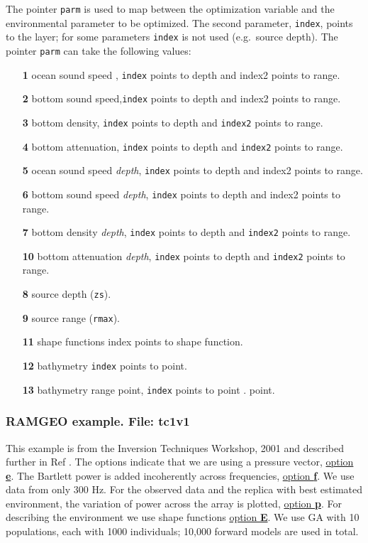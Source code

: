 \documentclass{saclantc}
\begin{document}
The pointer {\tt parm} is used to map between the optimization variable and the
environmental parameter to be optimized. The second parameter, {\tt index}, points to the
layer; for some parameters {\tt index} is not used (e.g.\ source depth).  
The pointer {\tt parm} can take the following values:
\begin{itemize}
   \item[\bf 1]  ocean sound speed , {\tt index} points to depth and index2 points to range.
   \item[\bf 2]  bottom sound speed,{\tt index} points to depth and index2
   points to range.
   \item[\bf 3]  bottom density, {\tt index} points to depth and {\tt index2} points to
   range.
   \item[\bf 4]  bottom attenuation, {\tt index}  points to depth and {\tt index2}
   points to range.
   \item[\bf 5]  ocean sound speed {\it depth}, {\tt index} points to depth and index2 points to range.
   \item[\bf 6]  bottom sound speed {\it depth}, {\tt index} points to depth and index2
   points to range.
   \item[\bf 7]  bottom density {\it depth},  {\tt index} points to depth and {\tt index2} points to
   range.
   \item[\bf 10]  bottom attenuation {\it depth}, {\tt index} points to depth and {\tt index2}
   points to range.

   \item[\bf 8]   source depth ({\tt zs}).
   \item[\bf 9]   source range ({\tt rmax}).
   \item[\bf 11]  shape functions  index points to shape function.
   \item[\bf 12]  bathymetry {\tt index} points to point.
   \item[\bf 13]  bathymetry range point,  {\tt index} points to point .
point. 
\end{itemize}

\subsubsection{RAMGEO example. File: {\bf tc1v1}}
\label{se:tc1} 
This example is from the Inversion Techniques Workshop,
 2001 and described further in Ref \cite{gerstoft03ph}. %
The options indicate that we are using a pressure vector, 
\underline{option {\bf e}}. 
The Bartlett power is added incoherently across frequencies, 
\underline{option {\bf f}}.  
We use data from only 300 Hz.
For the observed data and the replica with best estimated environment,
the variation of power across the array is plotted, \underline{option {\bf p}}.
For describing the environment we use shape functions \underline{option {\bf E}}.
We use GA with 10 populations,
each with 1000 individuals; 10,000 forward models are used in total.
\end{document}
